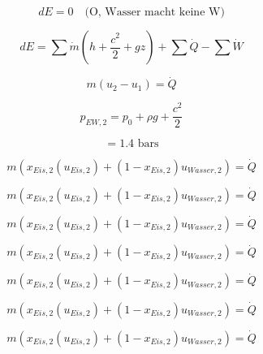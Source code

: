 \begin{equation*}
    dE = 0 \quad \text{(O, Wasser macht keine W)}
\end{equation*}

\begin{equation*}
    dE = \sum \dot{m} \left( h + \frac{c^2}{2} + gz \right) + \sum \dot{Q} - \sum \dot{W}
\end{equation*}

\begin{equation*}
    m (u_2 - u_1) = \dot{Q}
\end{equation*}

\begin{equation*}
    p_{EW,2} = p_0 + \rho g + \frac{c^2}{2}
\end{equation*}

\begin{equation*}
    = 1.4 \text{ bars}
\end{equation*}

\begin{equation*}
    m \left( x_{Eis,2} \left( u_{Eis,2} \right) + (1 - x_{Eis,2}) u_{Wasser,2} \right) = \dot{Q}
\end{equation*}

\begin{equation*}
    m \left( x_{Eis,2} \left( u_{Eis,2} \right) + (1 - x_{Eis,2}) u_{Wasser,2} \right) = \dot{Q}
\end{equation*}

\begin{equation*}
    m \left( x_{Eis,2} \left( u_{Eis,2} \right) + (1 - x_{Eis,2}) u_{Wasser,2} \right) = \dot{Q}
\end{equation*}

\begin{equation*}
    m \left( x_{Eis,2} \left( u_{Eis,2} \right) + (1 - x_{Eis,2}) u_{Wasser,2} \right) = \dot{Q}
\end{equation*}

\begin{equation*}
    m \left( x_{Eis,2} \left( u_{Eis,2} \right) + (1 - x_{Eis,2}) u_{Wasser,2} \right) = \dot{Q}
\end{equation*}

\begin{equation*}
    m \left( x_{Eis,2} \left( u_{Eis,2} \right) + (1 - x_{Eis,2}) u_{Wasser,2} \right) = \dot{Q}
\end{equation*}

\begin{equation*}
    m \left( x_{Eis,2} \left( u_{Eis,2} \right) + (1 - x_{Eis,2}) u_{Wasser,2} \right) = \dot{Q}
\end{equation*}

